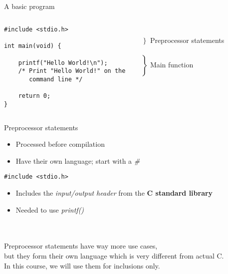 \documentclass[10pt,graphics,aspectratio=169,table]{beamer}
\begin{document}
\subsection{}
\begin{frame}[fragile]{A basic program}
	\begin{columns}[T]
		\begin{lstlisting}
#include <stdio.h>

int main(void) {

	printf("Hello World!\n");
	/* Print "Hello World!" on the
	   command line */

	return 0;
}
\end{lstlisting}
		
		\ \\$\left. \begin{array}{c}\\\end{array}\right\rbrace $ Preprocessor statements
		\ \\\ \\$\left. \begin{array}{c}\\\\\\\\\\\\\end{array}\right\rbrace $ Main function
	\end{columns}
\end{frame}
\begin{frame}[fragile]{Preprocessor statements}
	\begin{itemize}
		\item Processed before compilation
		\item Have their own language; start with a \textit{\#}
	\end{itemize}
	\begin{lstlisting}
#include <stdio.h>
\end{lstlisting}
	\begin{itemize}
		\item Includes the \textit{input/output header} from the \textbf{C standard library}
		\item Needed to use \textit{printf()}
	\end{itemize}\ \\ \ \\
	Preprocessor statements have way more use cases,\\
	but they form their own language which is very different from actual C.\\
	\bigskip
	In this course, we will use them for inclusions only.
\end{frame}
\end{document}
